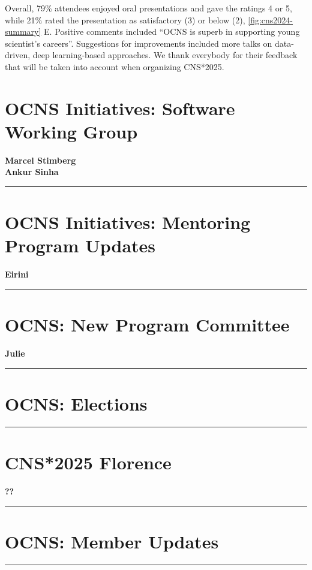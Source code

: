 \documentclass[11pt,a4paper,oneside]{article}
\begin{document}
Overall, 79\% attendees enjoyed oral presentations and gave the ratings 4 or 5, while 21\% rated the presentation as satisfactory (3) or below (2), \cref{fig:cns2024-summary} E.
Positive comments included \enquote{OCNS is superb in supporting young scientist's careers}.
Suggestions for improvements included more talks on data-driven, deep learning-based approaches.
We thank everybody for their feedback that will be taken into account when organizing CNS*2025.


\newpage
\section*{OCNS Initiatives: Software Working Group}%
\textbf{\large Marcel Stimberg \\
Ankur Sinha\\}
\rule{\textwidth}{0.4pt}
\lipsum[1-3]

\newpage
\section*{OCNS Initiatives: Mentoring Program Updates}%
\textbf{\large Eirini\\}
\rule{\textwidth}{0.4pt}
\lipsum[1-3]

\newpage
\section*{OCNS: New Program Committee}%
\textbf{\large Julie\\}
\rule{\textwidth}{0.4pt}
\lipsum[1-3]

\newpage
\section*{OCNS: Elections}%
\rule{\textwidth}{0.4pt}
\lipsum[1-3]

\newpage
\section*{CNS*2025 Florence}%
\textbf{\large ??\\}
\rule{\textwidth}{0.4pt}
\lipsum[1-3]

\newpage
\section*{OCNS: Member Updates}%
\rule{\textwidth}{0.4pt}
\lipsum[1-3]
\end{document}
